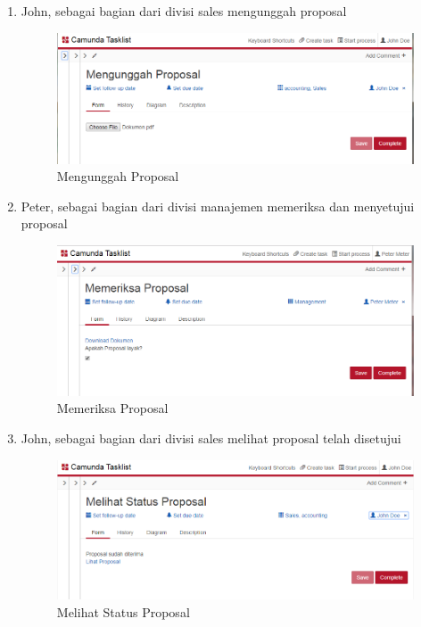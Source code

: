 \begin{enumerate}
	\item John, sebagai bagian dari divisi sales mengunggah proposal
	\begin{figure}[H]
			\centering
			\includegraphics[scale=0.6]{Gambar/Bab-3/BPMS/Kasus1/1}
			\caption{Mengunggah Proposal} 
			\label{fig:otomasi_kasus1_1}
	\end{figure}
	\item Peter, sebagai bagian dari divisi manajemen memeriksa dan menyetujui proposal
	\begin{figure}[H]
			\centering
			\includegraphics[scale=0.6]{Gambar/Bab-3/BPMS/Kasus1/2}
			\caption{Memeriksa Proposal} 
			\label{fig:otomasi_kasus1_2}
	\end{figure}
		\item John, sebagai bagian dari divisi sales melihat proposal telah disetujui
	\begin{figure}[H]
			\centering
			\includegraphics[scale=0.6]{Gambar/Bab-3/BPMS/Kasus1/3}
			\caption{Melihat Status Proposal} 
			\label{fig:otomasi_kasus1_3}
	\end{figure}
		
\end{enumerate}
		
